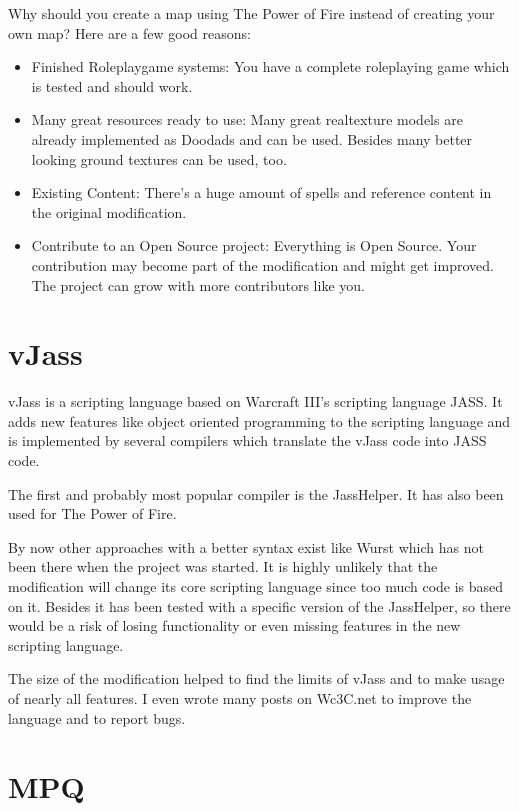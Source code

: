 \documentclass[a4paper,12pt,titlepage]{report}
\begin{document}
Why should you create a map using The Power of Fire instead of creating your own map?
Here are a few good reasons:
\begin{itemize}
\item Finished Roleplaygame systems: You have a complete roleplaying game which is tested and should work.
\item Many great resources ready to use: Many great realtexture models are already implemented as Doodads and can be used. Besides many better looking ground textures can be used, too.
\item Existing Content: There's a huge amount of spells and reference content in the original modification.
\item Contribute to an Open Source project: Everything is Open Source. Your contribution may become part of the modification and might get improved. The project can grow with more contributors like you.
\end{itemize}

\newpage

\chapter{vJass}

vJass is a scripting language based on Warcraft III's scripting language JASS. It adds new features like object oriented programming to the scripting language and is implemented by several compilers which translate the vJass code into JASS code.

The first and probably most popular compiler is the JassHelper. It has also been used for The Power of Fire.

By now other approaches with a better syntax exist like Wurst which has not been there when the project was started. It is highly unlikely that the modification will change its core scripting language since too much code is based on it. Besides it has been tested with a specific version of the JassHelper, so there would be a risk of losing functionality or even missing features in the new scripting language.

The size of the modification helped to find the limits of vJass and to make usage of nearly all features. I even wrote many posts on Wc3C.net to improve the language and to report bugs.

\newpage

\chapter{MPQ}
\end{document}
